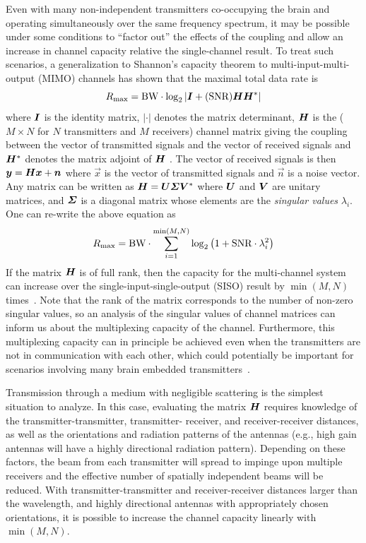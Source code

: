 Even with many non-independent transmitters co-occupying the brain and operating simultaneously over the same frequency spectrum, it may be possible under some conditions to ``factor out'' the effects of the coupling and allow an increase in channel capacity relative the single-channel result.
To treat such scenarios, a generalization to Shannon's capacity theorem to multi-input-multi-output (MIMO) channels has shown that the maximal total data rate is
\[R\sub{max} = \BW \cdot \log_2\left| \mat{I} + ( \SNR ) \mat{H}\mat{H}^* \right|\]
where $\mat{I}$ is the identity matrix, $|\cdot|$ denotes the matrix determinant, $\mat{H}$ is the ($M \times N$ for $N$ transmitters and $M$ receivers) channel matrix giving the coupling between the vector of transmitted signals and the vector of received signals and $\mat{H}^*$ denotes the matrix adjoint of $\mat{H}$ \cite{tulino04}. The vector of received signals is then $\vec{y}=\mat{H}\vec{x}+\vec{n}$ where $\vec{x}$ is the vector of transmitted signals and $\vec{n}$ is a noise vector. Any matrix can be written as $\mat{H}=\mat{U}\mat{\Sigma}\mat{V}^*$ where $\mat{U}$ and $\mat{V}$ are unitary matrices, and $\mat{\Sigma}$ is a diagonal matrix whose elements are the \emph{singular values} $\lambda_i$. One can re-write the above equation as
\[R_{\text{\scriptsize max}} = \text{BW} \cdot \sum_{i=1}^{\min(M,N)} \log_2\left(1+\text{SNR} \cdot \lambda_i^2\right)\]
If the matrix $\mat{H}$ is of full rank, then the capacity for the multi-channel system can increase over the single-input-single-output (SISO) result by $\min(M,N)$ times~\cite{shiu00}.
Note that the rank of the matrix corresponds to the number of non-zero singular values, so an analysis of the singular values of channel matrices can inform us about the multiplexing capacity of the channel.
Furthermore, this multiplexing capacity can in principle be achieved even when the transmitters are not in communication with each other, which could potentially be important for scenarios involving many brain embedded transmitters~\cite{spencer04}.

Transmission through a medium with negligible scattering is the simplest situation to analyze.
In this case, evaluating the matrix $\mat{H}$ requires knowledge of the transmitter-transmitter, transmitter- receiver, and receiver-receiver distances, as well as the orientations and radiation patterns of the antennas (e.g., high gain antennas will have a highly directional radiation pattern).
Depending on these factors, the beam from each transmitter will spread to impinge upon multiple receivers and the effective number of spatially independent beams will be reduced.
With transmitter-transmitter and receiver-receiver distances larger than the wavelength, and highly directional antennas with appropriately chosen orientations, it is possible to increase the channel capacity linearly with $\min(M,N)$.

